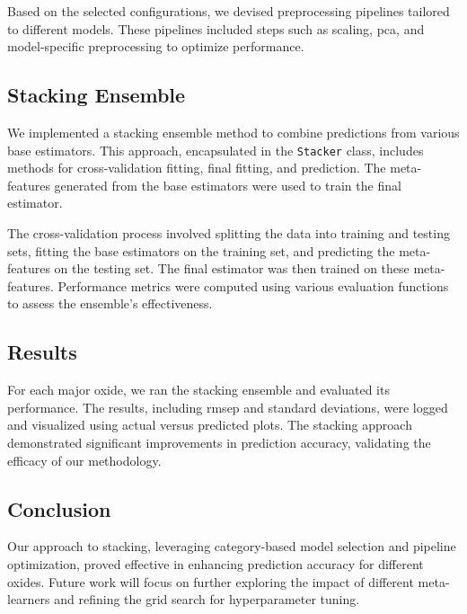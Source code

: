 Based on the selected configurations, we devised preprocessing pipelines tailored to different models.
These pipelines included steps such as scaling, \gls{pca}, and model-specific preprocessing to optimize performance.

\subsection{Stacking Ensemble}

We implemented a stacking ensemble method to combine predictions from various base estimators.
This approach, encapsulated in the \texttt{Stacker} class, includes methods for cross-validation fitting, final fitting, and prediction.
The meta-features generated from the base estimators were used to train the final estimator.

The cross-validation process involved splitting the data into training and testing sets, fitting the base estimators on the training set, and predicting the meta-features on the testing set.
The final estimator was then trained on these meta-features.
Performance metrics were computed using various evaluation functions to assess the ensemble's effectiveness.

\subsection{Results}

For each major oxide, we ran the stacking ensemble and evaluated its performance.
The results, including \gls{rmsep} and standard deviations, were logged and visualized using actual versus predicted plots.
The stacking approach demonstrated significant improvements in prediction accuracy, validating the efficacy of our methodology.

\subsection{Conclusion}

Our approach to stacking, leveraging category-based model selection and pipeline optimization, proved effective in enhancing prediction accuracy for different oxides.
Future work will focus on further exploring the impact of different meta-learners and refining the grid search for hyperparameter tuning.